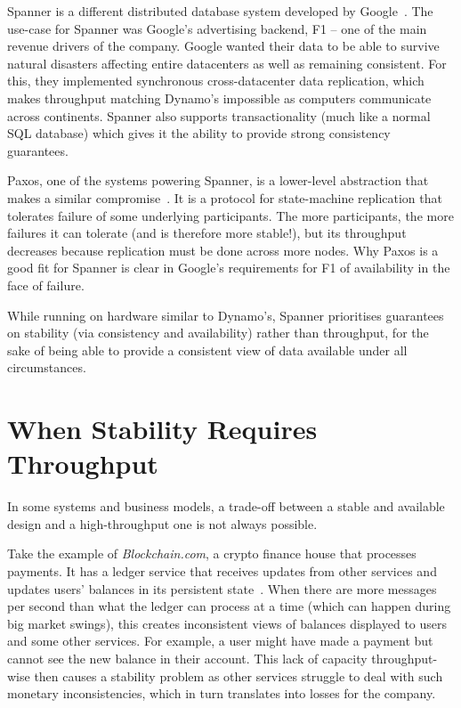 \documentclass[conference]{IEEEtran}
\begin{document}
    Spanner is a different distributed database system developed by Google~\cite{corbett2013spanner}.
    The use-case for Spanner was Google's advertising backend, F1 -- one of the main revenue drivers of the company.
    Google wanted their data to be able to survive natural disasters affecting entire datacenters as well as remaining consistent.
    For this, they implemented synchronous cross-datacenter data replication, which makes throughput matching Dynamo's impossible as computers communicate across continents.
    Spanner also supports transactionality (much like a normal SQL database) which gives it the ability to provide strong consistency guarantees.


    Paxos, one of the systems powering Spanner, is a lower-level abstraction that makes a similar compromise~\cite{van2015paxos}.
    It is a protocol for state-machine replication that tolerates failure of some underlying participants.
    The more participants, the more failures it can tolerate (and is therefore more stable!), but its throughput decreases because replication must be done across more nodes.
    Why Paxos is a good fit for Spanner is clear in Google's requirements for F1 of availability in the face of failure.

    While running on hardware similar to Dynamo's, Spanner prioritises guarantees on stability (via consistency and availability) rather than throughput, for the sake of being able to provide a consistent view of data available under all circumstances.

    \section{When Stability Requires Throughput}

    In some systems and business models, a trade-off between a stable and available design and a high-throughput one is not always possible.

    Take the example of \emph{Blockchain.com}, a crypto finance house that processes payments.
    It has a ledger service that receives updates from other services and updates users' balances in its persistent state~\cite{bcExperience}.
    When there are more messages per second than what the ledger can process at a time (which can happen during big market swings), this creates inconsistent views of balances displayed to users and some other services.
    For example, a user might have made a payment but cannot see the new balance in their account.
    This lack of capacity throughput-wise then causes a stability problem as other services struggle to deal with such monetary inconsistencies, which in turn translates into losses for the company.
\end{document}
